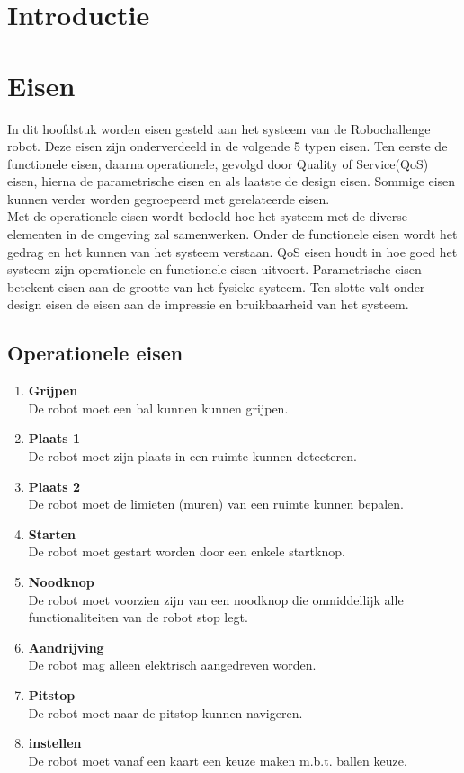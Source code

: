 \documentclass[12pt]{article} %
\begin{document}
\tableofcontents
\newpage
{}
\clearpage
\section{Introductie}
\label{sec:introduction}
\lipsum[0-3]
\newpage

\section{Eisen}
\label{sec:requirements}
In dit hoofdstuk worden eisen gesteld aan het systeem van de Robochallenge robot. Deze eisen zijn onderverdeeld in de volgende 5 typen eisen. Ten eerste de functionele eisen, daarna operationele, gevolgd door Quality of Service(QoS) eisen, hierna de parametrische eisen en als laatste de design eisen. Sommige eisen kunnen verder worden gegroepeerd met gerelateerde eisen.\\
Met de operationele eisen wordt bedoeld hoe het systeem met de diverse elementen in de omgeving zal samenwerken. 
Onder de functionele eisen wordt het gedrag en het kunnen van het systeem verstaan.
QoS eisen houdt in hoe goed het systeem zijn operationele en functionele eisen uitvoert.
Parametrische eisen betekent eisen aan de grootte van het fysieke systeem. 
Ten slotte valt onder design eisen de eisen aan de impressie en bruikbaarheid van het systeem.

\subsection{Operationele eisen}

\newcommand\litem[1]{\item{\bfseries #1\\}}
\begin{enumerate}
\litem{Grijpen} De robot moet een bal kunnen kunnen grijpen.
\litem{Plaats 1} De robot moet zijn plaats in een ruimte kunnen detecteren.
\litem{Plaats 2} De robot moet de limieten (muren) van een ruimte kunnen bepalen.
\litem{Starten} De robot moet gestart worden door een enkele startknop.
\litem{Noodknop} De robot moet voorzien zijn van een noodknop die onmiddellijk alle functionaliteiten van de robot stop legt.
\litem{Aandrijving} De robot mag alleen elektrisch aangedreven worden.
\litem{Pitstop} De robot moet naar de pitstop kunnen navigeren.
\litem{instellen} De robot moet vanaf een kaart een keuze maken m.b.t. ballen keuze.
\end{enumerate}
\end{document}
